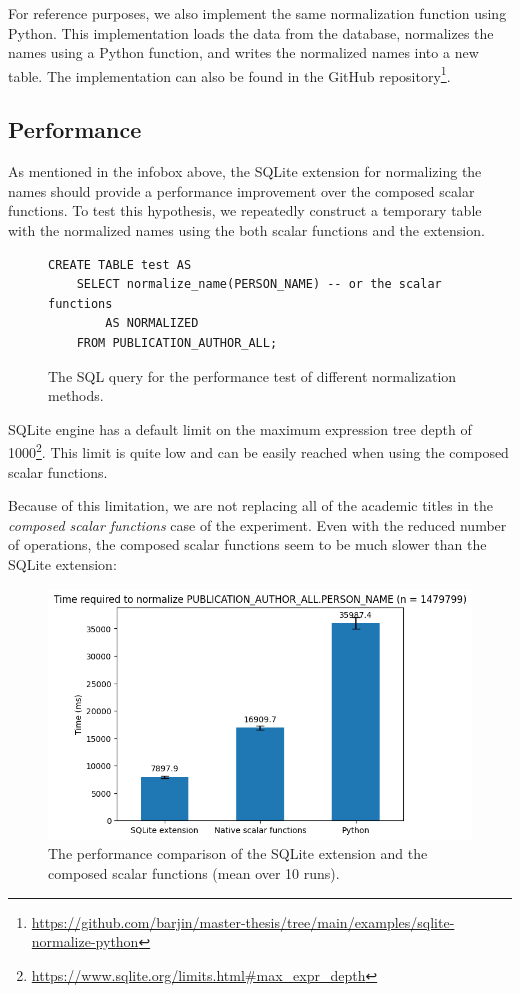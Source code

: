 For reference purposes, we also implement the same normalization function using Python.
This implementation loads the data from the database, normalizes the names using a Python function, and writes the normalized names into a new table.
The implementation can also be found in the GitHub repository\footnote{\url{https://github.com/barjin/master-thesis/tree/main/examples/sqlite-normalize-python}}.

\subsection{Performance}

As mentioned in the infobox above, the SQLite extension for normalizing the names should provide a performance improvement over the composed scalar functions.
To test this hypothesis, we repeatedly construct a temporary table with the normalized names using the both scalar functions and the extension.

\begin{figure}[!ht]
\begin{verbatim}
CREATE TABLE test AS 
    SELECT normalize_name(PERSON_NAME) -- or the scalar functions
        AS NORMALIZED 
    FROM PUBLICATION_AUTHOR_ALL;
\end{verbatim}
\captionsetup{width=.9\linewidth}
\caption{The SQL query for the performance test of different normalization methods.}

\end{figure}

SQLite engine has a default limit on the maximum expression tree depth of 1000\footnote{\url{https://www.sqlite.org/limits.html\#max_expr_depth}}.
This limit is quite low and can be easily reached when using the composed scalar functions.

Because of this limitation, we are not replacing all of the academic titles in the \textit{composed scalar functions} case of the experiment.
Even with the reduced number of operations, the composed scalar functions seem to be much slower than the SQLite extension:

\begin{figure}[ht!]
    \captionsetup{width=.9\linewidth}
    \includegraphics[width=\textwidth]{../img/sqlite_vs_native_scalar_functions.png}
    \centering
    \caption{The performance comparison of the SQLite extension and the composed scalar functions (mean over 10 runs).}
\end{figure}

